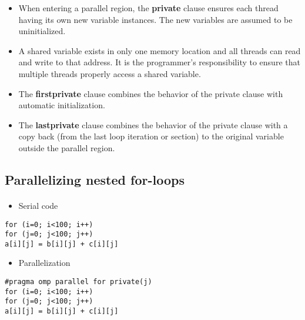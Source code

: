 \documentclass[%
oneside,                 %
final,                   %
10pt]{article}
\begin{document}
\begin{itemize}
\item When entering a parallel region, the \textbf{private} clause ensures each thread having its own new variable instances. The new variables are assumed to be uninitialized.

\item A shared variable exists in only one memory location and all threads can read and write to that address. It is the programmer's responsibility to ensure that multiple threads properly access a shared variable.

\item The \textbf{firstprivate} clause combines the behavior of the private clause with automatic initialization.

\item The \textbf{lastprivate} clause combines the behavior of the private clause with a copy back (from the last loop iteration or section) to the original variable outside the parallel region.
\end{itemize}

\noindent




\subsection*{Parallelizing nested for-loops}

\paragraph{}

\begin{itemize}
 \item Serial code
\end{itemize}

\noindent
\begin{verbatim}
for (i=0; i<100; i++)
for (j=0; j<100; j++)
a[i][j] = b[i][j] + c[i][j]
\end{verbatim}

\begin{itemize}
\item Parallelization
\end{itemize}

\noindent
\begin{verbatim}
#pragma omp parallel for private(j)
for (i=0; i<100; i++)
for (j=0; j<100; j++)
a[i][j] = b[i][j] + c[i][j]
\end{verbatim}
\end{document}
